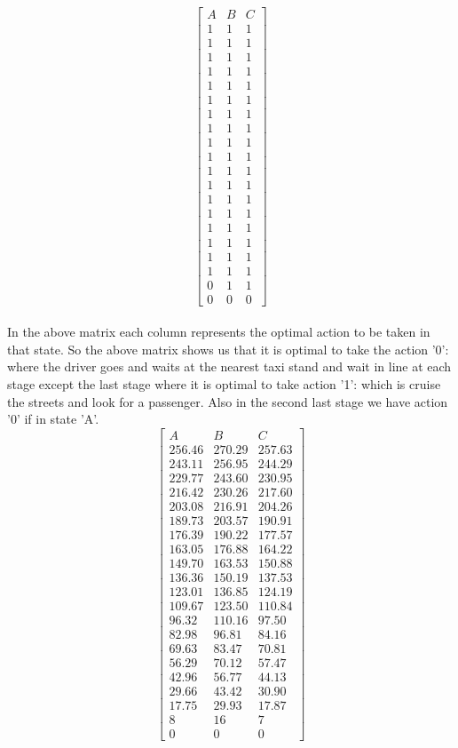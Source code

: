 \documentclass{article}
\begin{document}
 \[
\begin{bmatrix}
    A      &  B &  C  \\
    1       & 1 & 1  \\
    1       & 1 & 1  \\
    1       & 1 & 1  \\
    1       & 1 & 1  \\
    1       & 1 & 1  \\
    1       & 1 & 1  \\
    1       & 1 & 1  \\
    1       & 1 & 1  \\
    1       & 1 & 1  \\
    1       & 1 & 1  \\
    1       & 1 & 1  \\
    1       & 1 & 1  \\
    1       & 1 & 1  \\
    1       & 1 & 1  \\
    1       & 1 & 1  \\
    1       & 1 & 1  \\
    1       & 1 & 1  \\
    1       & 1 & 1  \\
    0       & 1 & 1  \\
    0       & 0 & 0
\end{bmatrix}
\]
\\
In the above matrix each column represents the optimal action to be taken in that state. So the above matrix shows us that it is optimal to take the action '0': where the driver goes and waits at the nearest taxi stand and wait in line at each stage except the last stage where it is optimal to take action '1': which is cruise the streets and look for a passenger. Also in the second last stage we have action '0'  if in state 'A'.
\[
\begin{bmatrix}
A   &  B   &   C\\
256.46& 270.29& 257.63\\
243.11& 256.95& 244.29\\
229.77& 243.60& 230.95\\
216.42& 230.26& 217.60\\
203.08& 216.91& 204.26\\
189.73& 203.57& 190.91\\
176.39& 190.22& 177.57\\
163.05& 176.88& 164.22\\
149.70& 163.53& 150.88\\
136.36& 150.19& 137.53\\
123.01 & 136.85& 124.19\\
109.67& 123.50& 110.84\\
 96.32& 110.16& 97.50\\
 82.98& 96.81& 84.16\\
 69.63& 83.47& 70.81\\
 56.29& 70.12& 57.47\\
 42.96& 56.77& 44.13\\
 29.66& 43.42& 30.90\\
 17.75& 29.93& 17.87\\
 8&16& 7\\
 0& 0& 0
\end{bmatrix}
\]\\
\end{document}
